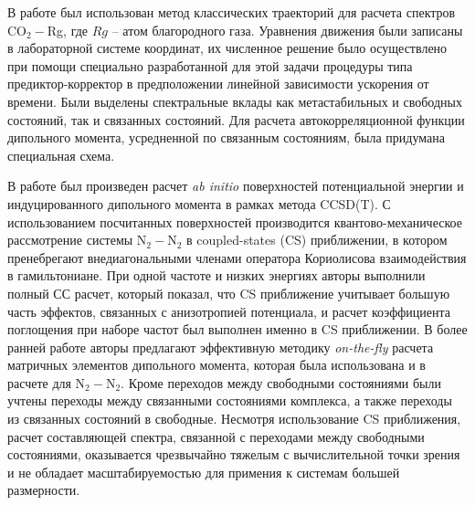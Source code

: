 В работе \cite{oparin2017} был использован метод классических траекторий для расчета спектров CO$_2-$Rg, где $Rg$ -- атом благородного газа. Уравнения движения были записаны в лабораторной системе координат, их численное решение было осуществлено при помощи специально разработанной для этой задачи процедуры типа предиктор-корректор в предположении линейной зависимости ускорения от времени. Были выделены спектральные вклады как метастабильных и свободных состояний, так и связанных состояний. Для расчета автокорреляционной функции дипольного момента, усредненной по связанным состояниям, была придумана специальная схема. \par 
В работе \cite{karman2015} был произведен расчет \textit{ab initio} поверхностей потенциальной энергии и индуцированного дипольного момента в рамках метода CCSD(T). С использованием посчитанных поверхностей производится квантово-механическое рассмотрение системы N$_2-$N$_2$ в coupled-states (CS) приближении, в котором пренебрегают внедиагональными членами оператора Кориолисова взаимодействия в гамильтониане. При одной частоте и низких энергиях авторы выполнили полный СС расчет, который показал, что CS приближение учитывает большую часть эффектов, связанных с анизотропией потенциала, и расчет коэффициента поглощения при наборе частот был выполнен именно в CS приближении. В более ранней работе \cite{karman2015_h2h2} авторы предлагают эффективную методику \textit{on-the-fly} расчета матричных элементов дипольного момента, которая была использована и в расчете для N$_2-$N$_2$. Кроме переходов между свободными состояниями были учтены переходы между связанными состояниями комплекса, а также переходы из связанных состояний в свободные. Несмотря использование CS приближения, расчет составляющей спектра, связанной с переходами между свободными состояниями, оказывается чрезвычайно тяжелым с вычислительной точки зрения и не обладает масштабируемостью для примения к системам большей размерности. \par
